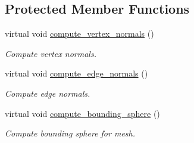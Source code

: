 \subsection*{Protected Member Functions}
\begin{DoxyCompactItemize}
\item 
virtual void \hyperlink{classdcel__mesh_ae52defbc7eed86fac011b24dc8c5a248}{compute\+\_\+vertex\+\_\+normals} ()
\begin{DoxyCompactList}\small\item\em Compute vertex normals. \end{DoxyCompactList}\item 
virtual void \hyperlink{classdcel__mesh_a7c555c83c180ca4593702b849dfc7892}{compute\+\_\+edge\+\_\+normals} ()
\begin{DoxyCompactList}\small\item\em Compute edge normals. \end{DoxyCompactList}\item 
virtual void \hyperlink{classdcel__mesh_af5792f51297f230c06e23e4c4ea4c3c8}{compute\+\_\+bounding\+\_\+sphere} ()
\begin{DoxyCompactList}\small\item\em Compute bounding sphere for mesh. \end{DoxyCompactList}\end{DoxyCompactItemize}
